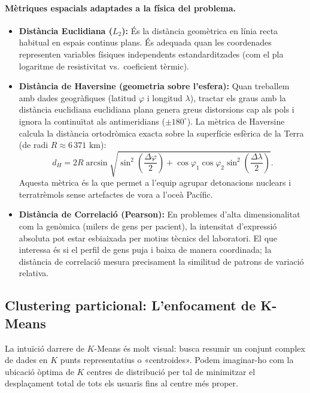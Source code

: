 \documentclass[a4paper,11pt]{article}
\begin{document}
\paragraph{Mètriques espacials adaptades a la física del problema.}
\begin{itemize}
    \item \textbf{Distància Euclidiana ($L_2$):} És la distància geomètrica en línia recta habitual en espais continus plans. És adequada quan les coordenades representen variables físiques independents estandarditzades (com el pla logaritme de resistivitat vs.\ coeficient tèrmic).
    \item \textbf{Distància de Haversine (geometria sobre l'esfera):} Quan treballem amb dades geogràfiques (latitud $\varphi$ i longitud $\lambda$), tractar els graus amb la distància euclidiana euclidiana plana genera greus distorsions cap als pols i ignora la continuïtat als antimeridians ($\pm 180^\circ$). La mètrica de Haversine \cite{sinnott1984} calcula la distància ortodròmica exacta sobre la superfície esfèrica de la Terra (de radi $R \approx 6\,371\text{ km}$):
    \begin{equation}
        d_H = 2 R \arcsin\sqrt{\sin^2\left(\frac{\Delta\varphi}{2}\right) + \cos\varphi_1\cos\varphi_2\sin^2\left(\frac{\Delta\lambda}{2}\right)}.
    \end{equation}
    Aquesta mètrica és la que permet a l'equip agrupar detonacions nuclears i terratrèmols sense artefactes de vora a l'oceà Pacífic.
    \item \textbf{Distància de Correlació (Pearson):} En problemes d'alta dimensionalitat com la genòmica (milers de gens per pacient), la intensitat d'expressió absoluta pot estar esbiaixada per motius tècnics del laboratori. El que interessa és si el perfil de gens puja i baixa de manera coordinada; la distància de correlació mesura precisament la similitud de patrons de variació relativa.
\end{itemize}

\subsection{Clustering particional: L'enfocament de K-Means}

La intuïció darrere de $K$-Means \cite{macqueen1967, lloyd1982} és molt visual: busca resumir un conjunt complex de dades en $K$ punts representatius o «centroides». Podem imaginar-ho com la ubicació òptima de $K$ centres de distribució per tal de minimitzar el desplaçament total de tots els usuaris fins al centre més proper.
\end{document}
